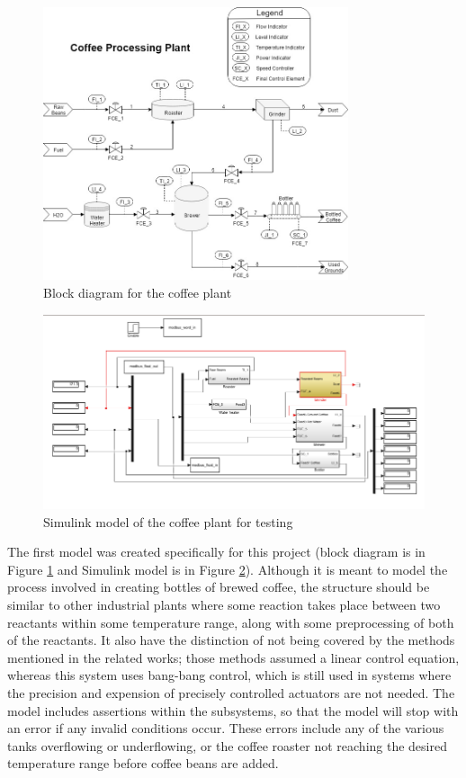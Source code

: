 \documentclass[10pt,twocolumn]{IEEEtran}
\begin{document}
\begin{figure}
  \centering
  \includegraphics[width=0.8\textwidth]{coffee.png}
  \caption{Block diagram for the coffee plant}
  \label{fig:coffee}
\end{figure}

\begin{figure}
  \centering
  \includegraphics[width=\textwidth]{coffee_simulink.png}
  \caption{Simulink model of the coffee plant for testing}
  \label{fig:coffee_simulink}
\end{figure}

The first model was created specifically for this project (block diagram is in Figure \ref{fig:coffee} and Simulink model is in Figure \ref{fig:coffee_simulink}).
Although it is meant to model the process involved in creating bottles of brewed coffee, the structure should be similar to other industrial plants where some reaction takes place between two reactants within some temperature range, along with some preprocessing of both of the reactants.
It also have the distinction of not being covered by the methods mentioned in the related works; those methods assumed a linear control equation, whereas this system uses bang-bang control, which is still used in systems where the precision and expension of precisely controlled actuators are not needed.
The model includes assertions within the subsystems, so that the model will stop with an error if any invalid conditions occur.
These errors include any of the various tanks overflowing or underflowing, or the coffee roaster not reaching the desired temperature range before coffee beans are added.
\end{document}
